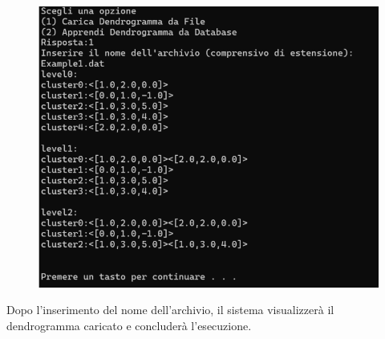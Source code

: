 \begin{figure}[h!]
    \centering
    \includegraphics[width=\textwidth]{images/inserimento_nome_archivio.png}
\end{figure}

Dopo l'inserimento del nome dell'archivio, il sistema visualizzerà il dendrogramma caricato e concluderà l'esecuzione.